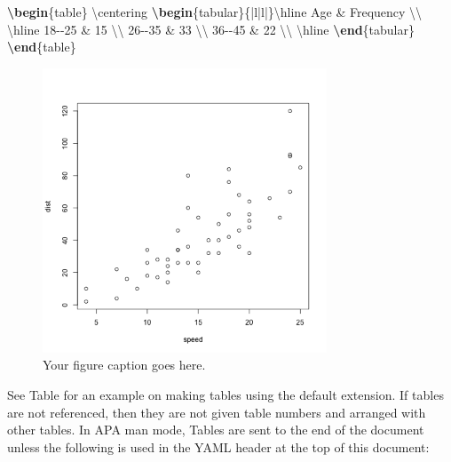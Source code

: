 \documentclass[\pandocDocMode,longtable,noextraspace,floatsintext]{apa6}
\newenvironment{Shaded}{}{}
\newcommand{\ExtensionTok}[1]{#1}
\newcommand{\FunctionTok}[1]{\textcolor[rgb]{0.02,0.16,0.49}{#1}}
\newcommand{\KeywordTok}[1]{\textcolor[rgb]{0.00,0.44,0.13}{\textbf{#1}}}
\newcommand{\NormalTok}[1]{#1}
\newcommand{\OperatorTok}[1]{\textcolor[rgb]{0.40,0.40,0.40}{#1}}
\begin{document}
\begin{Shaded}
\begin{Highlighting}[]
\KeywordTok{\textbackslash{}begin}\NormalTok{\{}\ExtensionTok{table}\NormalTok{\}}
\FunctionTok{\textbackslash{}centering}
\KeywordTok{\textbackslash{}begin}\NormalTok{\{}\ExtensionTok{tabular}\NormalTok{\}\{|l|l|\}}\FunctionTok{\textbackslash{}hline}
\NormalTok{Age }\OperatorTok{\&}\NormalTok{ Frequency }\FunctionTok{\textbackslash{}\textbackslash{}} \FunctionTok{\textbackslash{}hline}
\NormalTok{18{-}{-}25  }\OperatorTok{\&}\NormalTok{ 15 }\FunctionTok{\textbackslash{}\textbackslash{}}
\NormalTok{26{-}{-}35  }\OperatorTok{\&}\NormalTok{ 33 }\FunctionTok{\textbackslash{}\textbackslash{}}
\NormalTok{36{-}{-}45  }\OperatorTok{\&}\NormalTok{ 22 }\FunctionTok{\textbackslash{}\textbackslash{}} \FunctionTok{\textbackslash{}hline}
\KeywordTok{\textbackslash{}end}\NormalTok{\{}\ExtensionTok{tabular}\NormalTok{\}}
\KeywordTok{\textbackslash{}end}\NormalTok{\{}\ExtensionTok{table}\NormalTok{\}}
\end{Highlighting}
\end{Shaded}

\begin{figure}
\hypertarget{fig:myplot}{%
\centering
\includegraphics[width=3.333in,height=3.333in]{plot.png}
\caption{Your figure caption goes here.}\label{fig:myplot}
}
\end{figure}

See Table \textcite{tbl:mytable} for an example on making tables using
the default extension. If tables are not referenced, then they are not
given table numbers and arranged with other tables. In APA man mode,
Tables are sent to the end of the document unless the following is used
in the YAML header at the top of this document:
\end{document}
